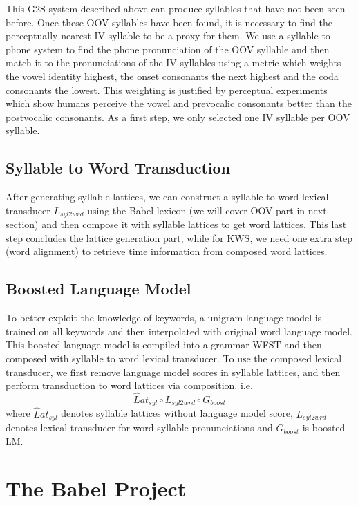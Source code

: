 \documentclass[journal]{IEEEtran}
\begin{document}
This G2S system described above can produce syllables that have not been seen before. 
Once these OOV syllables have been found, it is necessary to find the perceptually 
nearest IV syllable to be a proxy for them.  We use a syllable to phone system to 
find the phone pronunciation of the OOV syllable and then match it to the pronunciations 
of the IV syllables using a metric which weights the vowel identity highest, the onset 
consonants the next highest and the coda consonants the lowest. This weighting is justified 
by perceptual experiments which show humans perceive the vowel and prevocalic consonants 
better than the postvocalic consonants\cite{redford1999relative}. As a first step, we only selected one IV 
syllable per OOV syllable.

\subsection{Syllable to Word Transduction}
After generating syllable lattices, we can construct a syllable to word lexical transducer $L_{syl2wrd}$
using the Babel lexicon (we will cover OOV part in next section) and then compose it with syllable lattices 
to get word lattices. This last step concludes the lattice generation part, while for KWS, we need 
one extra step (word alignment) to retrieve time information from composed word lattices.

\subsection{Boosted Language Model}
To better exploit the knowledge of keywords, a unigram language model is trained on all keywords and 
then interpolated with original word language model. This boosted language model is compiled into 
a grammar WFST and then composed with syllable to word lexical transducer. To use the composed lexical 
transducer, we first remove language model scores in syllable lattices, and then perform transduction 
to word lattices via composition, i.e.
\begin{equation}
\hat Lat_{syl} \circ L_{syl2wrd} \circ G_{boost}
\end{equation}
where $\hat Lat_{syl}$ denotes syllable lattices without language model score, $L_{syl2wrd}$ denotes 
lexical transducer for word-syllable pronunciations and $G_{boost}$ is boosted LM.

\section{The Babel Project}
\end{document}
